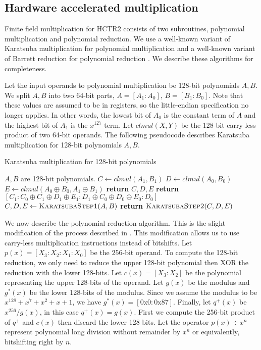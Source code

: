 \documentclass[hctr.tex]{subfiles}
\begin{document}
\subsection{Hardware accelerated multiplication}
Finite field multiplication for HCTR2 consists of two subroutines, polynomial multiplication and polynomial reduction. We use a well-known variant of Karatsuba multiplication for polynomial multiplication and a well-known variant of Barrett reduction for polynomial reduction \cite{CLMUL}. We describe these algorithms for completeness.

Let the input operands to polynomial multiplication be 128-bit polynomials $A, B$. We split $A, B$ into two 64-bit parts, $A = [A_1 : A_0]$, $B = [B_1 : B_0]$. Note that these values are assumed to be in registers, so the little-endian specification no longer applies. In other words, the lowest bit of $A_0$ is the constant term of $A$ and the highest bit of $A_1$ is the $x^{127}$ term. Let $clmul(X, Y)$ be the 128-bit carry-less product of two 64-bit operands. The following pseudocode describes Karatsuba multiplication for 128-bit polynomials $A, B$.
\begin{algorithm}[H]
\caption{Karatsuba multiplication for 128-bit polynomials}\label{karatsuba}
\begin{algorithmic}[1]
	\Require $A, B$ are 128-bit polynomials.
		\State $C \gets clmul(A_1, B_1)$
		\State $D \gets clmul(A_0, B_0)$
		\State $E \gets clmul(A_0 \oplus B_0, A_1 \oplus B_1)$
		\State \textbf{return} $C, D, E$
	\EndProcedure
	\State
		\State \textbf{return} $[C_1 : C_0 \oplus C_1 \oplus D_1 \oplus E_1 : D_1 \oplus C_0 \oplus D_0 \oplus E_0 : D_0]$
	\EndProcedure
	\State
		\State $C, D, E \gets \Call{KaratsubaStep1}{A, B}$
		\State \textbf{return} $\Call{KaratsubaStep2}{C, D, E}$
	\EndProcedure
\end{algorithmic}
\end{algorithm}
We now describe the polynomial reduction algorithm. This is the slight modification of the process described in \cite{CLMUL}. This modification allows us to use carry-less multiplication instructions instead of bitshifts. Let $p(x) = [X_3 : X_2 : X_1 : X_0]$ be the $256$-bit operand. To compute the 128-bit reduction, we only need to reduce the upper 128-bit polynomial then XOR the reduction with the lower 128-bits. Let $c(x) = [X_3 : X_2]$ be the polynomial representing the upper 128-bits of the operand. Let $g(x)$ be the modulus and $g^*(x)$ be the lower 128-bits of the modulus. Since we assume the modulus to be $x^{128} + x^7 + x^2 + x + 1$, we have $g^*(x) = [\text{0x0} : \text{0x87}]$. Finally, let $q^+(x)$ be $x^{256}/g(x)$, in this case $q^+(x) = g(x)$. First we compute the 256-bit product of $q^+$ and $c(x)$ then discard the lower 128 bits. Let the operator $p(x) \div x^{n}$ represent polynomial long division without remainder by $x^n$ or equivalently, bitshifting right by $n$.
\end{document}
